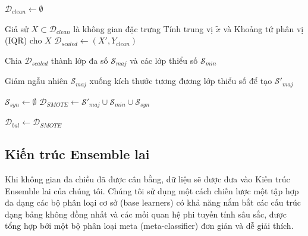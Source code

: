 \begin{algorithm}[hbt!]
\SetAlgoLined
{}

$\mathcal{D}_{clean} \leftarrow \emptyset$\;

Giả sử $X \subset \mathcal{D}_{clean}$ là không gian đặc trưng\;
Tính trung vị $\tilde{x}$ và Khoảng tứ phân vị (IQR) cho $X$\;
$\mathcal{D}_{scaled} \leftarrow (X', Y_{clean})$\;

Chia $\mathcal{D}_{scaled}$ thành lớp đa số $\mathcal{S}_{maj}$ và các lớp thiểu số $\mathcal{S}_{min}$\;

Giảm ngẫu nhiên $\mathcal{S}_{maj}$ xuống kích thước tương đương lớp thiểu số để tạo $\mathcal{S}'_{maj}$\;

$\mathcal{S}_{syn} \leftarrow \emptyset$\;
$\mathcal{D}_{SMOTE} \leftarrow \mathcal{S}'_{maj} \cup \mathcal{S}_{min} \cup \mathcal{S}_{syn}$\;

$\mathcal{D}_{bal} \leftarrow \mathcal{D}_{SMOTE}$\;

\caption{Tiền xử lý dữ liệu mạnh mẽ và cân bằng bằng SMOTEENN}
\label{algo:preprocessing}
\end{algorithm}

\subsection{Kiến trúc Ensemble lai}
Khi không gian đa chiều đã được cân bằng, dữ liệu sẽ được đưa vào Kiến trúc Ensemble lai của chúng tôi. Chúng tôi sử dụng một cách chiến lược một tập hợp đa dạng các bộ phân loại cơ sở (base learners) có khả năng nắm bắt các cấu trúc dạng bảng không đồng nhất và các mối quan hệ phi tuyến tính sâu sắc, được tổng hợp bởi một bộ phân loại meta (meta-classifier) đơn giản và dễ giải thích.

